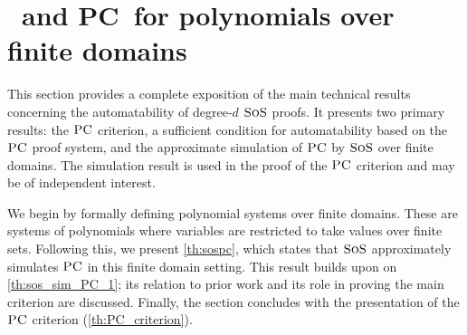 \documentclass[11pt]{article}
\newcommand{\sos}{\text{\sc{SoS}}}
\newcommand{\PC}{\textsc{PC}}
\newcommand{\I}{\emph{$\rm{I}$}}
\newcommand{\1}{\textbf{1}}
\begin{document}


\section{\sos\ and \PC\ for polynomials over finite domains}\label{sect:PC_criterion}

This section provides a complete exposition of the main technical results concerning the automatability of degree-$d$ $\sos$ proofs. It presents two primary results: the $\PC$ criterion, a sufficient condition for automatability based on the $\PC$ proof system, and the approximate simulation of $\PC$ by $\sos$ over finite domains. The simulation result is used in the proof of the $\PC$ criterion and may be of independent interest.

We begin by formally defining polynomial systems over finite domains. These are systems of polynomials where variables are restricted to take values over finite sets. Following this, we present \cref{th:sospc}, which states that $\sos$ approximately simulates $\PC$ in this finite domain setting. This result builds upon on \cref{th:sos_sim_PC_1}; its relation to prior work and its role in proving the main criterion are discussed. Finally, the section concludes with the presentation of the $\PC$ criterion (\cref{th:PC_criterion}). 
\end{document}
